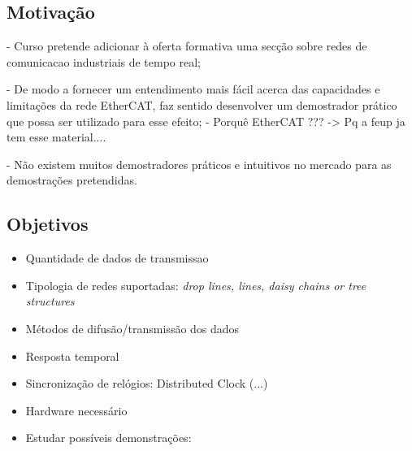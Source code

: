 % 

\subsection{Motivação}\label{sec:motivacao}

- Curso pretende adicionar à oferta formativa uma secção sobre redes de comunicacao industriais de tempo real;

- De modo a fornecer um entendimento mais fácil acerca das capacidades e limitações da rede EtherCAT, faz sentido desenvolver um demostrador prático que possa ser utilizado para esse efeito;
 - Porquê EtherCAT ??? -> Pq a feup ja tem esse material....

- Não existem muitos demostradores práticos e intuitivos no mercado para as demostrações pretendidas.


\subsection{Objetivos}\label{sec:objetivos}
% 
% 


\begin{itemize}
\item Quantidade de dados de transmissao
\item Tipologia de redes suportadas:
    \subitem \textit{drop lines, lines, daisy chains or tree structures}
\item Métodos de difusão/transmissão dos dados
\item Resposta temporal
\item Sincronização de relógios:
    \subitem Distributed Clock
    \subitem (...)
\item Hardware necessário
\item Estudar possíveis demonstrações:
\end{itemize}
